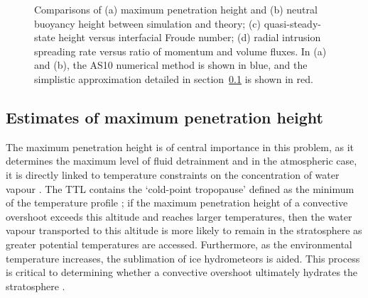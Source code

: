 \documentclass[a4paper]{article}
\begin{document}
\begin{figure}
	\centering
	\caption{Comparisons of (a) maximum penetration height and (b) neutral buoyancy height between simulation
	and theory; (c) quasi-steady-state height versus interfacial Froude number; (d) radial intrusion spreading
	rate versus ratio of momentum and volume fluxes. In (a) and (b), the AS10 numerical method is shown in
	blue, and the simplistic approximation detailed in section~\ref{sec:zmax} is shown in red.} 
	\label{fig:zcomp}
\end{figure}

\subsection{Estimates of maximum penetration height}
\label{sec:zmax}
The maximum penetration height is of central importance in this problem, as it determines the maximum level
of fluid detrainment \citep{ansong2008} and in the atmospheric case, it is directly linked to temperature
constraints on the concentration of water vapour \citep{jensen2007}. The TTL contains the `cold-point
tropopause' defined as the minimum of the temperature profile \citep{fueglistaler2009}; if the maximum
penetration height of a convective overshoot exceeds this altitude and reaches larger temperatures, then the water
vapour transported to this altitude is more likely to remain in the stratosphere as greater potential
temperatures are accessed. Furthermore, as the environmental temperature increases, the sublimation of ice
hydrometeors is aided. This process is critical to determining whether a convective overshoot ultimately
hydrates the stratosphere \citep{dauhut2018}.
\end{document}

